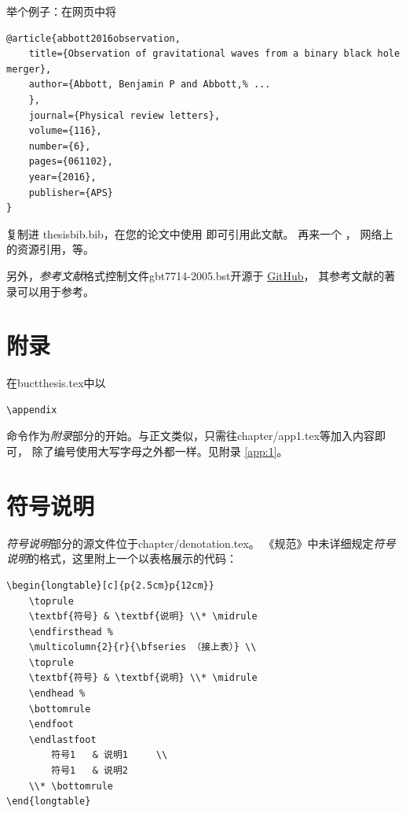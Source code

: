     举个例子：在网页中将
    \begin{lstlisting}
@article{abbott2016observation,
    title={Observation of gravitational waves from a binary black hole merger},
    author={Abbott, Benjamin P and Abbott,% ...
    },
    journal={Physical review letters},
    volume={116},
    number={6},
    pages={061102},
    year={2016},
    publisher={APS}
}
    \end{lstlisting}
	复制进 \textsf{thesisbib.bib}，在您的论文中使用
	即可引用此文献。 
	再来一个 ，
	网络上的资源引用，等。

	另外，\emph{参考文献}格式控制文件\textsf{gbt7714-2005.bst}开源于
	\href{https://github.com/Haixing-Hu/GBT7714-2005-BibTeX-Style}{GitHub}，
	其参考文献的著录可以用于参考。
    
    
\section{附录}\label{sec:app}
    在\textsf{buctthesis.tex}中以
    \begin{lstlisting}[firstnumber=68]
    \appendix
    \end{lstlisting}
    命令作为\emph{附录}部分的开始。与正文类似，只需往\textsf{chapter/app1.tex}等加入内容即可，
    除了编号使用大写字母之外都一样。见附录 \ref{app:1}。


\section{符号说明}\label{sec:deno}
	\emph{符号说明}部分的源文件位于\textsf{chapter/denotation.tex}。
    《规范》中未详细规定\emph{符号说明}的格式，这里附上一个以表格展示的代码：
    \begin{lstlisting}[caption=符号说明部分的跨页表格]
\begin{longtable}[c]{p{2.5cm}p{12cm}}
    \toprule
    \textbf{符号} & \textbf{说明} \\* \midrule
    \endfirsthead %
    \multicolumn{2}{r}{\bfseries （接上表）} \\
    \toprule
    \textbf{符号} & \textbf{说明} \\* \midrule
    \endhead %
    \bottomrule
    \endfoot
    \endlastfoot
        符号1   & 说明1     \\
        符号1   & 说明2     
    \\* \bottomrule
\end{longtable}        
    \end{lstlisting}

